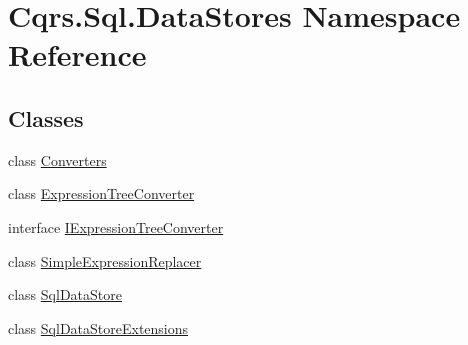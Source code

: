 \hypertarget{namespaceCqrs_1_1Sql_1_1DataStores}{}\section{Cqrs.\+Sql.\+Data\+Stores Namespace Reference}
\label{namespaceCqrs_1_1Sql_1_1DataStores}
\subsection*{Classes}
\begin{DoxyCompactItemize}
\item 
class \hyperlink{classCqrs_1_1Sql_1_1DataStores_1_1Converters}{Converters}
\item 
class \hyperlink{classCqrs_1_1Sql_1_1DataStores_1_1ExpressionTreeConverter}{Expression\+Tree\+Converter}
\item 
interface \hyperlink{interfaceCqrs_1_1Sql_1_1DataStores_1_1IExpressionTreeConverter}{I\+Expression\+Tree\+Converter}
\item 
class \hyperlink{classCqrs_1_1Sql_1_1DataStores_1_1SimpleExpressionReplacer}{Simple\+Expression\+Replacer}
\item 
class \hyperlink{classCqrs_1_1Sql_1_1DataStores_1_1SqlDataStore}{Sql\+Data\+Store}
\item 
class \hyperlink{classCqrs_1_1Sql_1_1DataStores_1_1SqlDataStoreExtensions}{Sql\+Data\+Store\+Extensions}
\end{DoxyCompactItemize}
